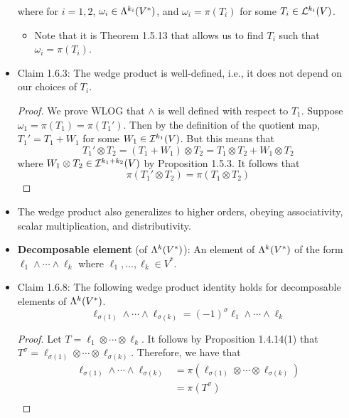 \documentclass[../notes.tex]{subfiles}
\begin{document}
\begin{itemize}
    where for $i=1,2$, $\omega_i\in\lam[k_i]{V^*}$, and $\omega_i=\pi(T_i)$ for some $T_i\in\lin[k_i]{V}$.
    \begin{itemize}
        \item Note that it is Theorem 1.5.13 that allows us to find $T_i$ such that $\omega_i=\pi(T_i)$.
    \end{itemize}
    \item Claim 1.6.3: The wedge product is well-defined, i.e., it does not depend on our choices of $T_i$.
    \begin{proof}
        We prove WLOG that $\wedge$ is well defined with respect to $T_1$. Suppose $\omega_1=\pi(T_1)=\pi(T_1')$. Then by the definition of the quotient map, $T_1'=T_1+W_1$ for some $W_1\in\ide[k_1]{V}$. But this means that
        \begin{equation*}
            T_1'\otimes T_2 = (T_1+W_1)\otimes T_2
            = T_1\otimes T_2+W_1\otimes T_2
        \end{equation*}
        where $W_1\otimes T_2\in\ide[k_1+k_2]{V}$ by Proposition 1.5.3. It follows that
        \begin{equation*}
            \pi(T_1'\otimes T_2) = \pi(T_1\otimes T_2)
        \end{equation*}
    \end{proof}
    \item The wedge product also generalizes to higher orders, obeying associativity, scalar multiplication, and distributivity.
    \item \textbf{Decomposable element} (of $\lam[k]{V^*}$): An element of $\lam[k]{V^*}$ of the form $\ell_1\wedge\cdots\wedge\ell_k$ where $\ell_1,\dots,\ell_k\in V^*$.
    \item Claim 1.6.8: The following wedge product identity holds for decomposable elements of $\lam[k]{V^*}$.
    \begin{equation*}
        \ell_{\sigma(1)}\wedge\cdots\wedge\ell_{\sigma(k)} = (-1)^\sigma\ell_1\wedge\cdots\wedge\ell_k
    \end{equation*}
    \begin{proof}
        Let $T=\ell_1\otimes\cdots\otimes\ell_k$. It follows by Proposition 1.4.14(1) that $T^\sigma=\ell_{\sigma(1)}\otimes\cdots\otimes\ell_{\sigma(k)}$. Therefore, we have that
        \begin{align*}
            \ell_{\sigma(1)}\wedge\cdots\wedge\ell_{\sigma(k)} &= \pi(\ell_{\sigma(1)}\otimes\cdots\otimes\ell_{\sigma(k)})\\
            &= \pi(T^\sigma)\\

\end{align*}
\end{proof}
\end{itemize}
\end{document}
